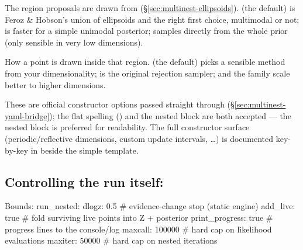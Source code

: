 \begin{keylist}
  \item[bound] The region proposals are drawn from
        (\S\ref{sec:multinest-ellipsoids}).  (the default) is Feroz \&
        Hobson's union of ellipsoids and the right first choice, multimodal or not;
         is faster for a simple unimodal posterior;  samples
        directly from the whole prior (only sensible in very low dimensions).
  \item[sample] How a point is drawn inside that region.  (the default)
        picks a sensible method from your dimensionality;  is the
        original  rejection sampler;  and the
         family scale better to higher dimensions.
\end{keylist}

These are official  constructor options passed straight through
(\S\ref{sec:multinest-yaml-bridge}); the flat spelling
() and the nested  block are
both accepted --- the nested block is preferred for readability. The full constructor
surface (periodic/reflective dimensions, custom update intervals, \ldots) is
documented key-by-key in  beside the simple
template.

\subsection{Controlling the run itself: }
\label{sec:nested-run-nested}

\begin{yamlwin}
Bounds:
  run_nested:
    dlogz: 0.5               # evidence-change stop (static engine)
    add_live: true             # fold surviving live points into Z + posterior
    print_progress: true         # progress lines to the console/log
    maxcall: 100000                 # hard cap on likelihood evaluations
    maxiter: 50000                    # hard cap on nested iterations
\end{yamlwin}

